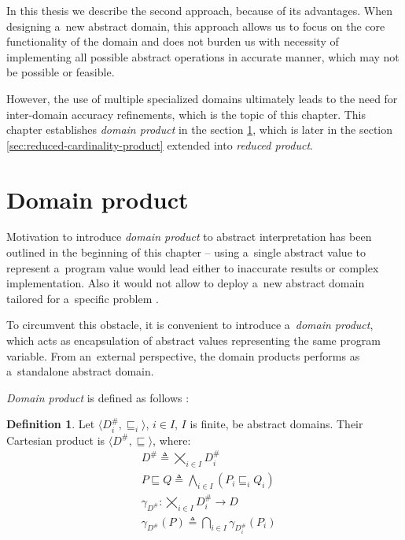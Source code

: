 \documentclass[12pt,oneside]{fithesis2}
\theoremstyle{definition}
\newtheorem{definition}{Definition}
\begin{document}
\vspace{1.5\baselineskip} %

In this thesis we describe the second approach, because of its advantages. When designing a~new abstract domain, this approach allows us to focus on the core functionality of the domain and does not burden us with necessity of implementing all possible abstract operations in accurate manner, which may not be possible or feasible.

However, the use of multiple specialized domains ultimately leads to the need for inter-domain accuracy refinements, which is the topic of this chapter. This chapter establishes \textit{domain product} in the section \ref{sec:domain-product}, which is later in the section \ref{sec:reduced-cardinality-product} extended into \textit{reduced product}.

\section{Domain product}\label{sec:domain-product}

Motivation to introduce \textit{domain product} to abstract interpretation has been outlined in the beginning of this chapter -- using a~single abstract value to represent a~program value would lead either to inaccurate results or complex implementation. Also it would not allow to deploy a~new abstract domain tailored for a~specific problem \cite{CousotEtAl06-ASIAN}.

To circumvent this obstacle, it is convenient to introduce a~\textit{domain product}, which acts as encapsulation of abstract values representing the same program variable. From an~external perspective, the domain products performs as a~standalone abstract domain.

\textit{Domain product} is defined as follows \cite{CousotCousotMauborgne-FoSSaCS-11}:

\begin{definition}
  Let $\langle D^\#_i, \sqsubseteq_i \rangle$, $i \in I$, $I$ is finite, be abstract domains. Their Cartesian product is $\langle D^\#, \sqsubseteq \rangle$, where:
  \begin{align*}
    &D^\# \triangleq \bigtimes_{i \in I} D^\#_i\\
    &P \sqsubseteq Q \triangleq \bigwedge_{i \in I}\left(P_i \sqsubseteq_i Q_i \right)\\
    &\gamma_{D^\#}: \bigtimes_{i \in I} D^\#_i \to D\\
    &\gamma_{D^\#}(P) \triangleq \bigcap_{i \in I} \gamma_{D^\#_i}\left( P_i \right)
  \end{align*}
\end{definition}
\end{document}
